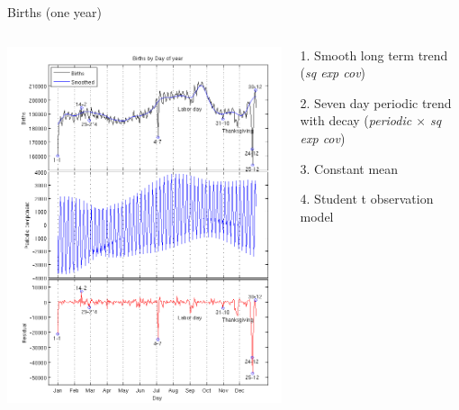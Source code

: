 \documentclass[11pt,ignorenonframetext,]{beamer}
\begin{document}
\begin{frame}{Births (one year)}

\begin{columns}
\begin{column}{0.5\textwidth}
\begin{center}
\includegraphics[width=\textwidth]{figs/births_pic1.png}
\end{center}
\end{column}
\begin{column}{0.5\textwidth}

1. Smooth long term trend \\ (\textit{sq exp cov})

\vspace{2mm}

2. Seven day periodic trend with decay (\textit{periodic $\times$ sq exp cov})

\vspace{2mm}

3. Constant mean

\vspace{2mm}

4. Student t observation model

\end{column}
\end{columns}

\end{frame}
\end{document}
